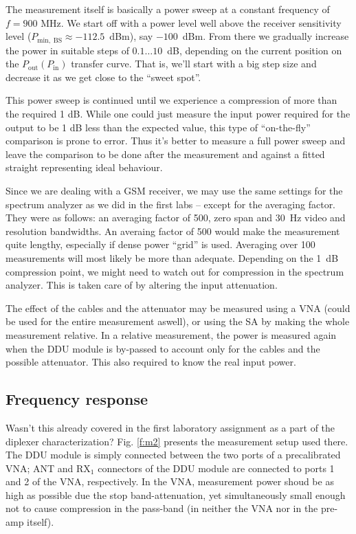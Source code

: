 \documentclass[a4paper, 12pt]{article}
\begin{document}
The measurement itself is basically a power sweep at a constant frequency of 
$f = 900$ MHz. We start off with a power level well above the receiver sensitivity 
level ($P_\mathrm{min,\;BS} \approx -112.5$~dBm), say $-100$~dBm. From there we 
gradually increase the power in suitable steps of $0.1 \ldots 10$~dB, depending on 
the current position on the $P_\mathrm{out}(P_\mathrm{in})$ transfer curve. That 
is, we'll start with a big step size and decrease it as we get close to the 
``sweet spot''. 

This power sweep is continued until we experience a compression of more than the 
required 1 dB. While one could just measure the input power required for the output 
to be 1 dB less than the expected value, this type of ``on-the-fly'' comparison 
is prone to error. Thus it's better to measure a full power sweep and leave the 
comparison to be done after the measurement and against a fitted straight representing 
ideal behaviour.

Since we are dealing with a GSM receiver, we may use the same settings for the 
spectrum analyzer as we did in the first labs -- except for the averaging factor. 
They were as follows: an averaging factor of 500, zero span and 30~Hz video and 
resolution bandwidths. An averaing factor of 500 would make the measurement quite 
lengthy, especially if dense power ``grid'' is used. Averaging over 100 measurements 
will most likely be more than adequate. Depending on the 1~dB compression point, 
we might need to watch out for compression in the spectrum analyzer. This is taken 
care of by altering the input attenuation.

The effect of the cables and the attenuator may be measured using a VNA (could be used 
for the entire measurement aswell), or using the SA by making the whole measurement 
relative. In a relative measurement, the power is measured again when the DDU module 
is by-passed to account only for the cables and the possible attenuator. This also 
required to know the real input power. 


\subsection{Frequency response}

Wasn't this already covered in the first laboratory assignment as a part of the 
diplexer characterization? Fig. \ref{f:m2} presents the measurement setup used 
there. The DDU module is simply connected between the two ports of a precalibrated 
VNA; ANT and RX$_1$ connectors of the DDU module are connected to ports 1 and 2 of 
the VNA, respectively. In the VNA, measurement power shoud be as high as possible 
due the stop band-attenuation, yet simultaneously small enough not to cause 
compression in the pass-band (in neither the VNA nor in the pre-amp itself).
\end{document}
